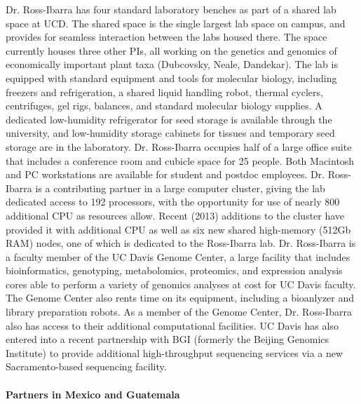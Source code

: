 Dr. Ross-Ibarra has four standard laboratory benches as part of a shared lab space at UCD.  The shared space is the single largest lab space on campus, and provides for seamless interaction between the labs housed there.  The space currently houses three other PIs, all working on the genetics and genomics of economically important plant taxa (Dubcovsky, Neale, Dandekar). The lab is equipped with standard equipment and tools for molecular biology, including freezers and refrigeration, a shared liquid handling robot, thermal cyclers, centrifuges, gel rigs, balances, and standard molecular biology supplies.  A dedicated low-humidity refrigerator for seed storage is available through the university, and low-humidity storage cabinets for tissues and temporary seed storage are in the laboratory. Dr. Ross-Ibarra occupies half of a large office suite that includes a conference room and cubicle space for 25 people.  Both Macintosh and PC workstations are available for student and postdoc employees. Dr. Ross-Ibarra is a contributing partner in a large computer cluster, giving the lab dedicated access to 192 processors, with the opportunity for use of nearly 800 additional CPU as resources allow. Recent (2013) additions to the cluster have provided it with additional CPU as well as six new shared high-memory (512Gb RAM) nodes, one of which is dedicated to the Ross-Ibarra lab. Dr. Ross-Ibarra is a faculty member of the UC Davis Genome Center, a large facility that includes bioinformatics, genotyping, metabolomics, proteomics, and expression analysis cores able to perform a variety of genomics analyses at cost for UC Davis faculty. The Genome Center also rents time on its equipment, including a bioanlyzer and library preparation robots. As a member of the Genome Center, Dr. Ross-Ibarra also has access to their additional computational facilities. UC Davis has also entered into a recent partnership with BGI (formerly the Beijing Genomics Institute) to provide additional high-throughput sequencing services via a new Sacramento-based sequencing facility.

\paragraph{\textbf{Partners in Mexico and Guatemala}}\

